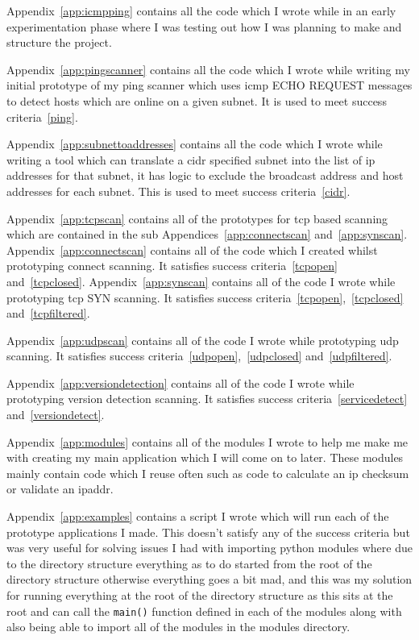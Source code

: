 \documentclass[titlepage]{article}
\begin{document}
Appendix~\ref{app:icmpping} contains all the code which I wrote while in an early experimentation
phase where I was testing out how I was planning to make and structure the project.

Appendix~\ref{app:pingscanner} contains all the code which I wrote while writing my initial prototype
of my ping scanner which uses \gls{icmp} ECHO REQUEST messages to detect hosts which are online on a given
subnet.
It is used to meet success criteria~\ref{ping}.

Appendix~\ref{app:subnettoaddresses} contains all the code which I wrote while writing a tool which
can translate a \gls{cidr} specified subnet into the list of \gls{ip} addresses for that subnet,
it has logic to exclude the broadcast address and host addresses for each subnet.
This is used to meet success criteria~\ref{cidr}.

Appendix~\ref{app:tcpscan} contains all of the prototypes for \gls{tcp} based scanning which are contained
in the sub Appendices~\ref{app:connectscan} and~\ref{app:synscan}. Appendix~\ref{app:connectscan} contains
all of the code which I created whilst prototyping connect scanning. It satisfies success criteria~\ref{tcpopen}
and~\ref{tcpclosed}. Appendix~\ref{app:synscan} contains all of the code I wrote while prototyping \gls{tcp} SYN
scanning. It satisfies success criteria~\ref{tcpopen},~\ref{tcpclosed} and~\ref{tcpfiltered}.

Appendix~\ref{app:udpscan} contains all of the code I wrote while prototyping \gls{udp} scanning.
It satisfies success criteria~\ref{udpopen},~\ref{udpclosed} and~\ref{udpfiltered}.

Appendix~\ref{app:versiondetection} contains all of the code I wrote while prototyping version detection
scanning. It satisfies success criteria~\ref{servicedetect} and~\ref{versiondetect}.

Appendix~\ref{app:modules} contains all of the modules I wrote to help me make me with creating
my main application which I will come on to later. These modules mainly contain code which I reuse often
such as code to calculate an ip checksum or validate an \gls{ipaddr}.

Appendix~\ref{app:examples} contains a script I wrote which will run each of the prototype applications I
made. This doesn't satisfy any of the success criteria but was very useful for solving issues I had with
importing python modules where due to the directory structure everything as to do started from the root of
the directory structure otherwise everything goes a bit mad, and this was my solution for running everything
at the root of the directory structure as this sits at the root and can call the \verb|main()| function
defined in each of the modules along with also being able to import all of the modules in the modules directory.
\end{document}
